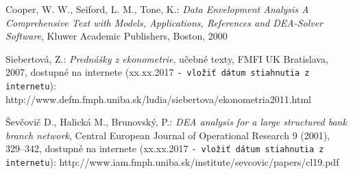 \begin{thebibliography}{99}

	 Cooper, W. W., Seiford, L. M., Tone, K.: {\it Data Envelopment Analysis A Comprehensive Text with Models, Applications, References and DEA-Solver Software}, Kluwer Academic Publishers,  Boston, 2000
	
	 Siebertová, Z.: {\it Prednášky z ekonometrie}, učebné texty, FMFI UK Bratislava, 2007, dostupné na internete (xx.xx.2017 {\tt - vložiť dátum stiahnutia z internetu}):  http://www.defm.fmph.uniba.sk/ludia/siebertova/ekonometria2011.html
	
	 Ševčovič D., Halická M., Brunovský, P.: {\it DEA analysis for a large structured bank branch network}, Central European Journal of Operational Research 9 (2001), 329--342, dostupné na internete (xx.xx.2017  {\tt - vložiť dátum stiahnutia z internetu}):  http://www.iam.fmph.uniba.sk/institute/sevcovic/papers/cl19.pdf
\end{thebibliography}
%
%
%
%
%
